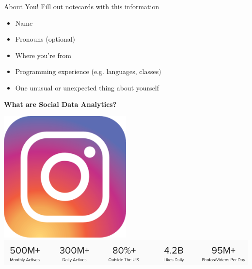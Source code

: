 \documentclass{beamer}
\begin{document}
\begin{frame}{About You!}
  Fill out notecards with this information
  \begin{itemize}
    \item Name
    \item Pronouns (optional)
    \item Where you're from
    \item Programming experience (e.g. languages, classes)
    \item One unusual or unexpected thing about yourself
  \end{itemize}    
\end{frame}

\begin{frame}[plain]
  \begin{center}
    \bf \LARGE What are Social Data Analytics?
  \end{center}
\end{frame}

\begin{frame}[plain]
  \begin{center}
      \includegraphics[width=0.5\textwidth]{img/instagram-logo.png} \\
      \includegraphics[width=\textwidth]{img/instagram-stats.png} \\
  \end{center}
\end{frame}
\end{document}
